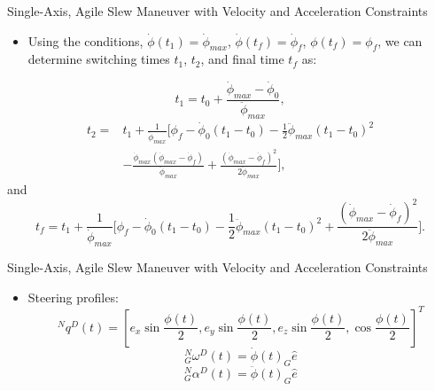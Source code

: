 \documentclass{beamer}
\begin{document}
\begin{frame}
\begin{block}{ Single-Axis, Agile Slew Maneuver with Velocity and Acceleration Constraints}
\begin{itemize}
\item Using the conditions, $\dot{\phi}(t_1)=\dot{\phi}_{max}$, $\dot{\phi}(t_f)=\dot{\phi}_f$, $\phi(t_f)=\phi_f$, we can determine switching times $t_1$, $t_2$, and final time $t_f$ as:
\end{itemize}
 \begin{equation}\label{t1cons}
t_1=t_0+\frac{\dot{\phi}_{max}-\dot{\phi}_0}{\ddot{\phi}_{max}},
 \end{equation}
 \begin{equation}\label{t2cons}
 \begin{split}
 t_2=&t_1+\frac{1}{\dot{\phi}_{max}}\Big[ \phi_f-\dot{\phi}_0(t_1-t_0)-\frac{1}{2}\ddot{\phi}_{max}(t_1-t_0)^2\\
 &-\frac{\dot{\phi}_{max}(\dot{\phi}_{max}-\dot{\phi}_f)}{\ddot{\phi}_{max}}+\frac{(\dot{\phi}_{max}-\dot{\phi}_f)^2}{2\ddot{\phi}_{max}} \Big],
 \end{split}
 \end{equation}
and
  \begin{equation}\label{tfcons}
 t_f=t_1+\frac{1}{\dot{\phi}_{max}}\Big[ \phi_f-\dot{\phi}_0(t_1-t_0)-\frac{1}{2}\ddot{\phi}_{max}(t_1-t_0)^2+\frac{(\dot{\phi}_{max}-\dot{\phi}_f)^2}{2\ddot{\phi}_{max}} \Big].
 \end{equation}
\end{block}
\end{frame}

\begin{frame}
\begin{block}{ Single-Axis, Agile Slew Maneuver with Velocity and Acceleration Constraints}
\begin{itemize}
\item Steering profiles:
\begin{equation}
^Nq^D(t)=[e_x\sin\frac{\phi(t)}{2}, e_y\sin\frac{\phi(t)}{2}, e_z\sin\frac{\phi(t)}{2}, \cos\frac{\phi(t)}{2}]^T
\end{equation}
\begin{equation}
^N_G\omega^D(t)=\dot{\phi}(t)_G\hat{e}
\end{equation}
\begin{equation}
^N_G\alpha^D(t)=\ddot{\phi}(t)_G\hat{e}
\end{equation}
\end{itemize}
\end{block}
\end{frame}
\end{document}
